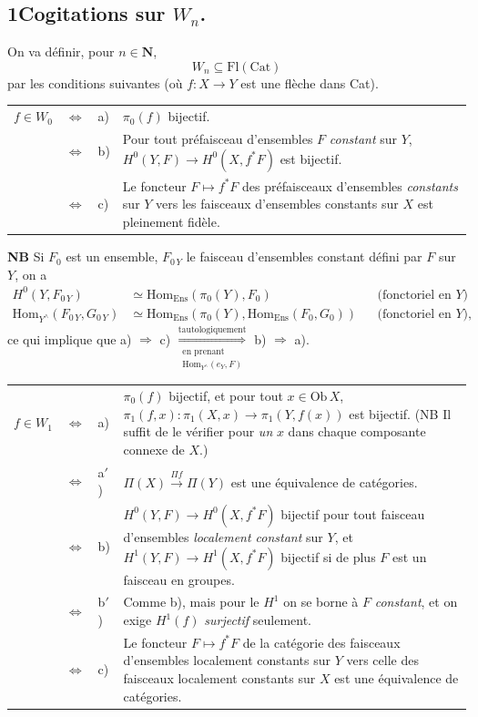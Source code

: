 \documentclass[11pt]{article}
\newcommand{\Ob}{\mathrm{Ob}\,}
\newcommand{\HomEns}{\mathrm{Hom}_{\mathrm{Ens}}}
\begin{document}
\subsection*{1\quad Cogitations sur $W_n$.}

On va définir, pour $n \in \mathbf{N}$,
\[
W_n \subseteq \mathrm{Fl}(\mathrm{Cat})
\]
par les conditions suivantes (où $f : X \longrightarrow Y$ est une flèche dans Cat).

\noindent\begin{tabular}{@{}l c l >{\RaggedRight\arraybackslash}p{}@{}}
$f \in W_0$ & $\Longleftrightarrow$ & a) & $\pi_0(f)$ bijectif.\\
 & $\Longleftrightarrow$ & b) & Pour tout préfaisceau d'ensembles $F$ \textit{constant} sur $Y$, $H^0(Y,F) \longrightarrow H^0(X,f^*F)$ est bijectif.\\
 & $\Longleftrightarrow$ & c) & Le foncteur $F \longmapsto f^*F$ des préfaisceaux d'ensembles \textit{constants} sur $Y$ vers les faisceaux d'ensembles constants sur $X$ est pleinement fidèle.
\end{tabular}



\textbf{NB} Si $F_0$ est un ensemble, $F_{0\,Y}$ le faisceau d'ensembles constant défini par $F$ sur $Y$, on a
\[
\begin{aligned}
H^0(Y,F_{0\,Y}) &\simeq \HomEns(\pi_0(Y),F_0) && \text{(fonctoriel en $Y$)}\\
\mathrm{Hom}_{Y^\wedge}(F_{0\,Y},G_{0\,Y}) &\simeq \HomEns(\pi_0(Y),\HomEns(F_0,G_0)) && \text{(fonctoriel en $Y$),}
\end{aligned}
\]
ce qui implique que a) $\Longrightarrow$ c) $\underset{\substack{\text{en prenant}\\ \mathrm{Hom}_{Y^\wedge}(e_Y,F)}}{\overset{\text{tautologiquement}}{\Longrightarrow}}$ b) $\Longrightarrow$ a).

\noindent\begin{tabular}{@{}l c l >{\RaggedRight\arraybackslash}p{}@{}}
$f \in W_1$ & $\Longleftrightarrow$ & a) & $\pi_0(f)$ bijectif, et pour tout $x \in \Ob X$, $\pi_1(f,x) : \pi_1(X,x) \longrightarrow \pi_1(Y,f(x))$ est bijectif. (NB Il suffit de le vérifier pour \textit{un} $x$ dans chaque composante connexe de $X$.)\\
 & $\Longleftrightarrow$ & a$'$) & $\Pi(X) \xrightarrow{\Pi f} \Pi(Y)$ est une équivalence de catégories.\\
 & $\Longleftrightarrow$ & b) & $H^0(Y,F) \longrightarrow H^0(X,f^*F)$ bijectif pour tout faisceau d'ensembles \textit{localement constant} sur $Y$, et $H^1(Y,F) \longrightarrow H^1(X,f^*F)$ bijectif si de plus $F$ est un faisceau en groupes.\\
 & $\Longleftrightarrow$ & b$'$) & Comme b), mais pour le $H^1$ on se borne à $F$ \textit{constant}, et on exige $H^1(f)$ \textit{surjectif} seulement.\\
 & $\Longleftrightarrow$ & c) & Le foncteur $F \longmapsto f^*F$ de la catégorie des faisceaux d'ensembles localement constants sur $Y$ vers celle des faisceaux localement constants sur $X$ est une équivalence de catégories.
\end{tabular}
\end{document}
